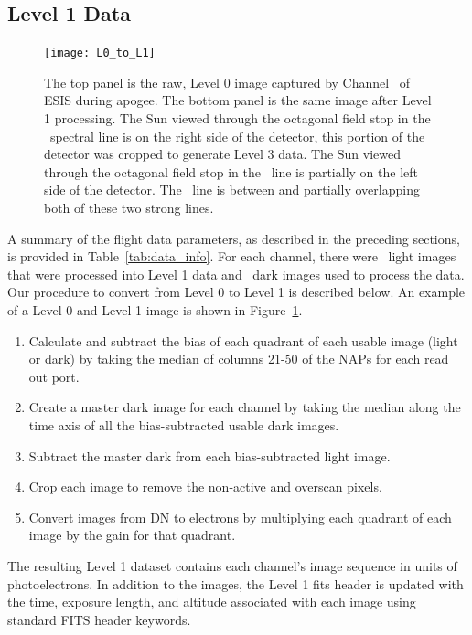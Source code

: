 \subsection{Level 1 Data}
	    \begin{figure}
	    	\centering
	    	\texttt{[image: L0\_to\_L1]}
	    	\caption{The top panel is the raw, Level 0 image captured by Channel \ of ESIS during apogee. The bottom panel is the same image after Level 1 processing. The Sun viewed through the octagonal field stop in the \ov \ spectral line is on the right side of the detector, this portion of the detector was cropped to generate Level 3 data.  The Sun viewed through the octagonal field stop in the \hei \ line is partially on the left side of the detector. The \mgxbright \ line is between and partially overlapping both of these two strong lines.}
	    	\label{fig:L0_to_L1}
	    \end{figure}
    	
A summary of the flight data parameters, as described in the preceding sections, is provided in Table~\ref{tab:data_info}. 
For each channel, there were \numDataFrames\ light images that were processed into Level 1 data and \numDarkFrames\ dark images used to process the data.
Our procedure to convert from Level 0 to Level 1 is described below. An example of a Level 0 and Level 1 image is shown in Figure~\ref{fig:L0_to_L1}.

\begin{enumerate}
    \item Calculate and subtract the bias of each quadrant of each usable image (light or dark) by taking the median of columns 21-50 of the NAPs for each read out port.   
    \item Create a master dark image for each channel by taking the median along the time axis of all the bias-subtracted usable dark images.
    \item Subtract the master dark from each bias-subtracted light image.
    \item Crop each image to remove the non-active and overscan pixels.
    \item Convert images from DN to electrons by multiplying each quadrant of each image by the gain for that quadrant.
\end{enumerate}
The resulting Level 1 dataset contains each channel's image sequence in units of photoelectrons.
In addition to the images, the Level 1 fits header is updated with the time, exposure length, and altitude associated with each image using standard FITS header keywords.   
	

